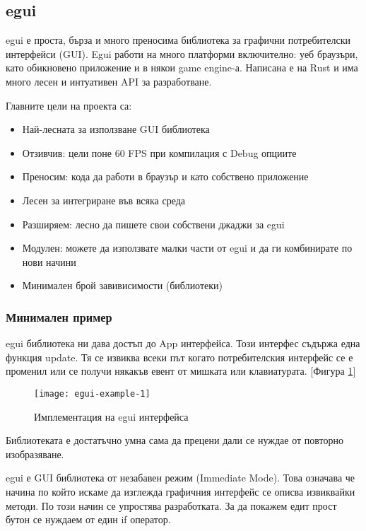 \subsection{egui}
egui е проста, бърза и много преносима библиотека за графични потребителски
интерфейси (GUI). Egui работи на много платформи включително: уеб браузъри, като
обикновено приложение и в някои game engine-а. Написана е на Rust и има много
лесен и интуативен API за разработване.

Главните цели на проекта са:
\begin{itemize}
    \item Най-лесната за използване GUI библиотека
    \item Отзивчив: цели поне 60 FPS при компилация с Debug опциите
    \item Преносим: кода да работи в браузър и като собствено приложение
    \item Лесен за интегриране във всяка среда
    \item Разширяем: лесно да пишете свои собствени джаджи за egui
    \item Модулен: можете да използвате малки части от egui и да ги комбинирате
    по нови начини \item Минимален брой завивисимости (библиотеки)
\end{itemize}

\subsubsection{Минимален пример}
egui библиотека ни дава достъп до App интерфейса. Този интерфес съдържа една
функция update. Тя се извиква всеки път когато потребителския интерфейс се е
променил или се получи някакъв евент от мишката или клавиатурата. 
[Фигура \ref{fig:egui-example-1}]

\begin{figure}[!htb]
  \texttt{[image: egui-example-1]}
  \centering
  \caption{Имплементация на egui интерфейса}
  \label{fig:egui-example-1}
\end{figure}

Библиотеката е достатъчно умна сама да прецени дали се нуждае от повторно
изобразяване.

egui е GUI библиотека от незабавен режим (Immediate Mode). Това означава че
начина по който искаме да изглежда графичния интерфейс се описва извиквайки
методи. По този начин се упростява разработката. За да покажем едит прост
бутон се нуждаем от един if оператор.
